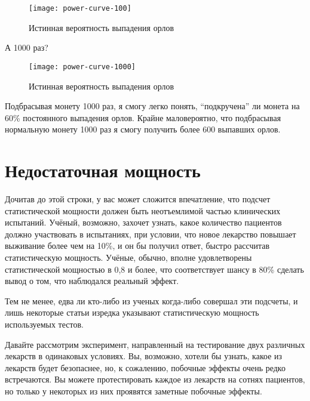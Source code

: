 \begin{figure}[h!]
    \centering
    \texttt{[image: power-curve-100]}
    \caption{Истинная вероятность выпадения орлов}
    \label{fig3:powercurve100}
\end{figure}


А 1000 раз?

\begin{figure}[h!]
    \centering
    \texttt{[image: power-curve-1000]}
    \caption{Истинная вероятность выпадения орлов}
    \label{fig3:powercurve1000}
\end{figure}

Подбрасывая монету 1000 раз, я смогу легко понять, ``подкручена'' ли монета на 60\% постоянного выпадения орлов. Крайне маловероятно, что подбрасывая нормальную монету 1000 раз я смогу получить более 600 выпавших орлов.



\section[Недостаточная мощность]{Недостаточная мощность}
\label{chp3:powerunderpowered}

Дочитав до этой строки, у вас может сложится впечатление, что подсчет статистической мощности должен быть неотъемлимой частью клинических испытаний. Учёный, возможно, захочет узнать, какое количество пациентов должно участвовать в испытаниях, при условии, что новое лекарство повышает выживание более чем на 10\%, и он бы получил ответ, быстро рассчитав статистическую мощность. Учёные, обычно, вполне удовлетворены статистической мощностью в 0,8 и более, что соответствует шансу в 80\% сделать вывод о том, что наблюдался реальный эффект. 

Тем не менее, едва ли кто-либо из ученых когда-либо совершал эти подсчеты, и лишь некоторые статьи изредка указывают статистическую мощность используемых тестов.

Давайте рассмотрим эксперимент, направленный на тестирование двух различных лекарств в одинаковых условиях. Вы, возможно, хотели бы узнать, какое из лекарств будет безопаснее, но, к сожалению, побочные эффекты очень редко встречаются. Вы можете протестировать каждое из лекарств на сотнях пациентов, но только у некоторых из них проявятся заметные побочные эффекты.

